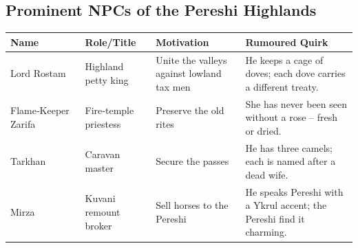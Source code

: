\documentclass[11pt]{book}
\begin{document}
\subsection*{Prominent NPCs of the Pereshi Highlands}
\begin{longtable}{|p{}|p{}|p{}|p{}|}
\hline
\textbf{Name} & \textbf{Role/Title} & \textbf{Motivation} & \textbf{Rumoured Quirk} \\
\hline
Lord Rostam & Highland petty king & Unite the valleys against lowland tax men & He keeps a cage of doves; each dove carries a different treaty. \\
\hline
Flame‑Keeper Zarifa & Fire‑temple priestess & Preserve the old rites & She has never been seen without a rose – fresh or dried. \\
\hline
Tarkhan & Caravan master & Secure the passes & He has three camels; each is named after a dead wife. \\
\hline
Mirza & Kuvani remount broker & Sell horses to the Pereshi & He speaks Pereshi with a Ykrul accent; the Pereshi find it charming. \\
\hline
\end{longtable}
\end{document}

